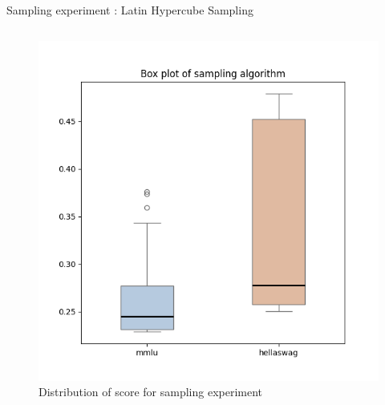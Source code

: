 \begin{frame}[allowframebreaks]{Sampling experiment : Latin Hypercube Sampling}
\begin{columns}
    \begin{column}{0.45\textwidth}
        \begin{figure}
            \centering
            \includegraphics[width = \textwidth]{imgs/experiments/lhs_box_plot.png}     
            \caption{Distribution of score for sampling experiment}         
        \end{figure}
         
    \end{column}
\end{columns}  
    \framebreak


\end{frame}
